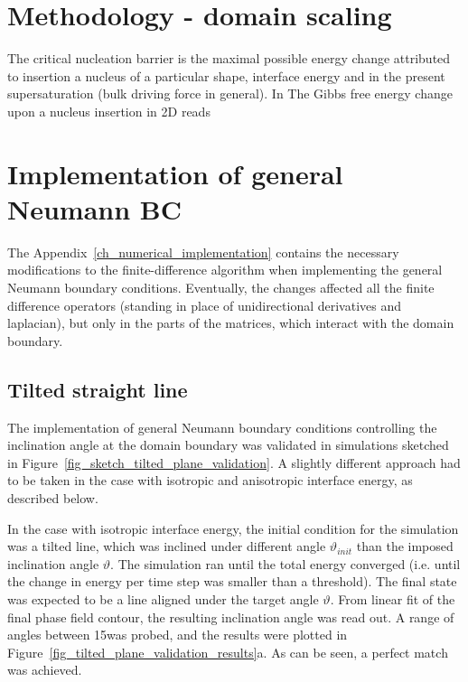 \section{Methodology - domain scaling}
The critical nucleation barrier is the maximal possible energy change attributed to insertion a nucleus of a particular shape, interface energy and in the present supersaturation (bulk driving force in general). In 
The Gibbs free energy change upon a nucleus insertion in 2D reads 


\section{Implementation of general Neumann BC}
The Appendix~\ref{ch_numerical_implementation} contains the necessary modifications to the finite-difference algorithm when implementing the general Neumann boundary conditions. Eventually, the changes affected all the finite difference operators (standing in place of unidirectional derivatives and laplacian), but only in the parts of the matrices, which interact with the domain boundary.

	\subsection{Tilted straight line}
	The implementation of general Neumann boundary conditions controlling the inclination angle at the domain boundary was validated in simulations sketched in Figure~\ref{fig_sketch_tilted_plane_validation}. A slightly different approach had to be taken in the case with isotropic and anisotropic interface energy, as described below.
	
	In the case with isotropic interface energy, the initial condition for the simulation was a tilted line, which was inclined under different angle $\vartheta_{init}$ than the imposed inclination angle $\vartheta$. The simulation ran until the total energy converged (i.e. until the change in energy per time step was smaller than a threshold). The final state was expected to be a line aligned under the target angle $\vartheta$. From linear fit of the final phase field contour, the resulting inclination angle was read out. A range of angles between 15\textdegree was probed, and the results were plotted in Figure~\ref{fig_tilted_plane_validation_results}a. As can be seen, a perfect match was achieved.
	
